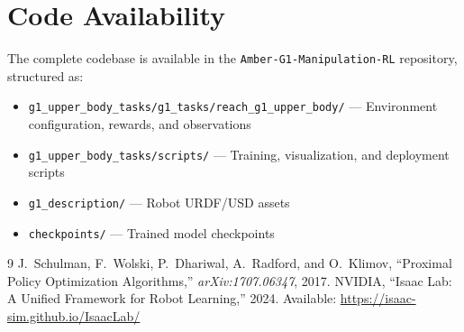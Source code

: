 \documentclass[11pt,a4paper]{article}
\begin{document}
\section*{Code Availability}
The complete codebase is available in the \texttt{Amber-G1-Manipulation-RL} repository, structured as:
\begin{itemize}[nosep]
  \item \texttt{g1\_upper\_body\_tasks/g1\_tasks/reach\_g1\_upper\_body/} --- Environment configuration, rewards, and observations
  \item \texttt{g1\_upper\_body\_tasks/scripts/} --- Training, visualization, and deployment scripts
  \item \texttt{g1\_description/} --- Robot URDF/USD assets
  \item \texttt{checkpoints/} --- Trained model checkpoints
\end{itemize}

\begin{thebibliography}{9}
 J.~Schulman, F.~Wolski, P.~Dhariwal, A.~Radford, and O.~Klimov, ``Proximal Policy Optimization Algorithms,'' \textit{arXiv:1707.06347}, 2017.
 NVIDIA, ``Isaac Lab: A Unified Framework for Robot Learning,'' 2024. Available: \url{https://isaac-sim.github.io/IsaacLab/}
\end{thebibliography}
\end{document}
